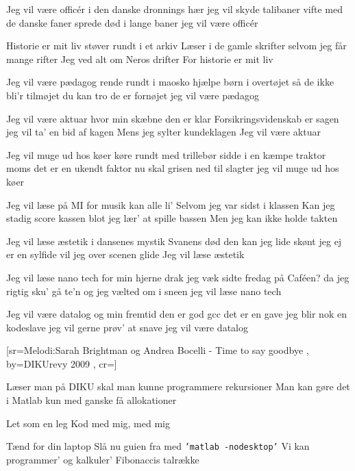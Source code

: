 \documentclass[pdftex,12pt]{article}
\begin{document}
\begin{songs}{}
\endverse
\beginverse
Jeg vil være officér
i den danske dronnings hær
jeg vil skyde talibaner
vifte med de danske faner
sprede død i lange baner
jeg vil være officér

\endverse
\beginverse
Historie er mit liv
støver rundt i et arkiv
Læser i de gamle skrifter
selvom jeg får mange rifter
Jeg ved alt om Neros drifter
For historie er mit liv

\endverse
\beginverse
Jeg vil være pædagog
rende rundt i maosko
hjælpe børn i overtøjet
så de ikke bli'r tilmøjet
du kan tro de er fornøjet
jeg vil være pædagog

\endverse
\beginverse
Jeg vil være aktuar
hvor min skæbne den er klar
Forsikringsvidenskab er sagen
jeg vil ta' en bid af kagen
Mens jeg sylter kundeklagen
Jeg vil være aktuar

\endverse
\beginverse
Jeg vil muge ud hos køer
køre rundt med trillebør
sidde i en kæmpe traktor
moms det er en ukendt faktor
nu skal grisen ned til slagter
jeg vil muge ud hos køer

\endverse
\beginverse
Jeg vil læse på MI
for musik kan alle li'
Selvom jeg var sidst i klassen
Kan jeg stadig score kassen
blot jeg lær' at spille bassen
Men jeg kan ikke holde takten

\endverse
\beginverse
Jeg vil læse æstetik
i dansenes mystik
Svanens død den kan jeg lide
skønt jeg ej er en sylfide
vil jeg over scenen glide
Jeg vil læse æstetik

\endverse
\beginverse
Jeg vil læse nano tech
for min hjerne drak jeg væk
sidte fredag på Caféen?
da jeg rigtig sku' gå te'n
og jeg vælted om i sneen
jeg vil læse nano tech

\endverse
\beginverse
Jeg vil være datalog
og min fremtid den er god
gcc det er en gave
jeg blir nok en kodeslave
jeg vil gerne prøv' at snave
jeg vil være datalog

\endverse
\endsong



﻿[sr={Melodi:Sarah Brightman og Andrea Bocelli - Time to say goodbye}
,
by={DIKUrevy 2009}
,
cr={}]\hypertarget{function fib(n)}{}
\label{song10}

\beginverse
Læser man på DIKU skal man kunne programmere rekursioner
Man kan gøre det i Matlab kun med ganske få allokationer

\endverse
\beginverse
Let som en leg
Kod med mig, med mig

\endverse
\beginverse
Tænd for din laptop
Slå nu guien fra med \texttt{'matlab -nodesktop'}
Vi kan programmer'
og kalkuler'
Fibonaccis talrække


\end{songs}
\end{document}
